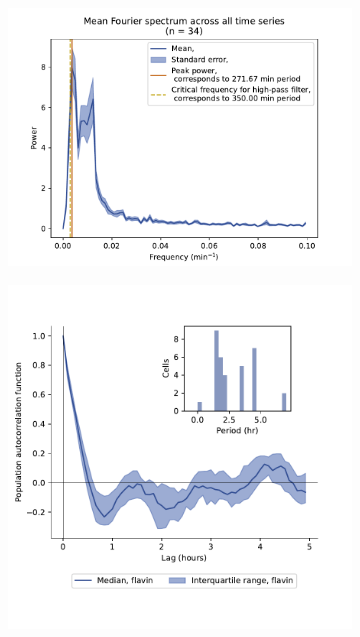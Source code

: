 \begin{figure}
  \centering
  \begin{subfigure}[htpb]{0.45\textwidth}
   \centering
   \includegraphics[width=\textwidth]{cenpkkoetter_20212_13.pdf}
   \caption{
   }
   \label{fig:biology-cenpk-sync-fourier}
  \end{subfigure}%
  \begin{subfigure}[htpb]{0.45\textwidth}
   \centering
   \includegraphics[width=\textwidth]{cenpkkoetter_20212_12.pdf}
   \caption{
   }
   \label{fig:biology-cenpk-sync-acf}
  \end{subfigure}


\end{figure}
